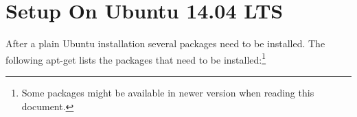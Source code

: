 \documentclass[a4paper,fontsize=10pt,twoside,DIV15,BCOR12mm,headinclude=true,footinclude=false,pagesize,bibtotoc]{scrbook}
\begin{document}
%
%
%
%
%
%
%
%


\section{Setup On Ubuntu 14.04 LTS}

After a plain Ubuntu installation several packages need to be installed.
The following apt-get lists the packages that need to be
installed:\footnote{Some packages might be available in newer version
when reading this document.}
\end{document}
